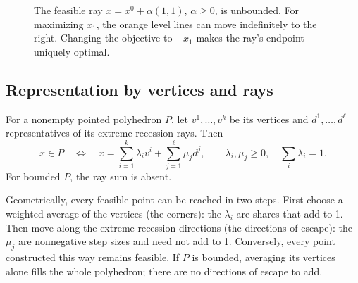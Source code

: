 \documentclass[11pt,a4paper]{article}
\begin{document}
\begin{figure}[H]
  \centering
  \caption{The feasible ray $x=x^0+\alpha(1,1)$, $\alpha\geq0$, is unbounded.
    For maximizing $x_1$, the orange level lines can move indefinitely to the right.
    Changing the objective to $-x_1$ makes the ray's endpoint uniquely optimal.}
  \label{fig:unbounded-ray}
\end{figure}

\subsection{Representation by vertices and rays}
\begin{theorem}\label{thm:representation}
  For a nonempty pointed polyhedron $P$, let $v^1,\ldots,v^k$ be its vertices and
  $d^1,\ldots,d^\ell$ representatives of its extreme recession rays. Then
  \[
    x\in P\quad\Longleftrightarrow\quad
    x=\sum_{i=1}^k\lambda_i v^i+\sum_{j=1}^{\ell}\mu_j d^j,
    \qquad \lambda_i,\mu_j\geq0,\quad\sum_i\lambda_i=1.
  \]
  For bounded $P$, the ray sum is absent.
\end{theorem}
Geometrically, every feasible point can be reached in two steps. First choose
a weighted average of the vertices (the corners): the $\lambda_i$ are shares
that add to 1. Then move along the extreme recession directions (the directions
of escape): the $\mu_j$ are nonnegative step sizes and need not add to 1.
Conversely, every point constructed this way remains feasible. If $P$ is
bounded, averaging its vertices alone fills the whole polyhedron; there are
no directions of escape to add.
\end{document}
